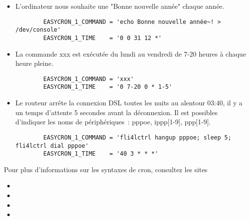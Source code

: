 \begin{description}
\begin{itemize}
\item   L'ordinateur nous souhaite une "Bonne nouvelle année" chaque année.
\begin{example}
\begin{verbatim}
        EASYCRON_1_COMMAND = 'echo Bonne nouvelle année~! > /dev/console'
        EASYCRON_1_TIME    = '0 0 31 12 *'
\end{verbatim}
\end{example}

\item   La commande xxx est exécutée du lundi au vendredi de 7-20 heures
       à chaque heure pleine.
\begin{example}
\begin{verbatim}
        EASYCRON_1_COMMAND = 'xxx'
        EASYCRON_1_TIME    = '0 7-20 0 * 1-5'
\end{verbatim}
\end{example}


\item   Le routeur arrête la connexion DSL toutes les nuits au alentour 03:40,
       il y a un temps d'attente 5 secondes avant la déconnexion. Il est possibles
       d'indiquer les noms de périphériques~: pppoe, ippp[1-9], ppp[1-9].
\begin{example}
\begin{verbatim}
        EASYCRON_1_COMMAND = 'fli4lctrl hangup pppoe; sleep 5; fli4lctrl dial pppoe'
        EASYCRON_1_TIME    = '40 3 * * *'
\end{verbatim}
\end{example}
\end{itemize}


       Pour plus d'informations sur les syntaxes de cron, consultez les sites
       \begin{itemize}
       \item {}
       \item {}
       \item {}
       \item {}
       \end{itemize}



\end{description}
